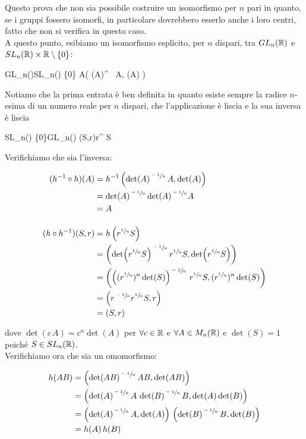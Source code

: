 Questo prova che non sia possibile costruire un isomorfismo per $ n $ pari in quanto, se i gruppi fossero isomorfi, in particolare dovrebbero esserlo anche i loro centri, fatto che non si verifica in questo caso.\\
A questo punto, esibiamo un isomorfismo esplicito, per $ n $ dispari, tra $ GL_{n}(\mathbb{R}) $ e $ SL_{n}(\mathbb{R}) \times \mathbb{R} \setminus \{0\} $:

%
	{GL_{n}(\R)}{SL_{n}(\R) \times \R \setminus \{0\}}%
	{A}{\left( \det(A)^{} \, A, \det(A) \right)}

Notiamo che la prima entrata è ben definita in quanto esiste sempre la radice $ n $-esima di un numero reale per $ n $ dispari, che l'applicazione è liscia e la sua inversa è liscia

%
	{SL_{n}(\R) \times \R \setminus \{0\}}{GL_{n}(\R)}%
	{(S,r)}{r^{} S}
	
Verifichiamo che sia l'inversa:

\begin{align}
	\begin{split}
		(h^{-1} \circ h)(A) &= h^{-1} \left( \det(A)^{\sfrac{-1}{n}} \, A, \det(A) \right)\\
		&= \det(A)^{\sfrac{-1}{n}} \det(A)^{\sfrac{-1}{n}} A\\
		&= A\\\\
		(h \circ h^{-1})(S,r) &= h \left( r^{\sfrac{1}{n}} S \right)\\
		&= \left( \det(r^{\sfrac{1}{n}} S)^{\sfrac{-1}{n}} \, r^{\sfrac{1}{n}} S, \det(r^{\sfrac{1}{n}} S) \right)\\
		&= \left( \left( (r^{\sfrac{1}{n}})^{n} \det(S) \right)^{\sfrac{-1}{n}} \, r^{\sfrac{1}{n}} S, (r^{\sfrac{1}{n}})^{n} \det(S) \right)\\
		&= \left( r^{\sfrac{-1}{n}} r^{\sfrac{1}{n}} S, r \right)\\
		&= (S,r)
	\end{split}
\end{align}

dove $ \det(c \, A) = c^{n} \det(A) $ per $ \forall c \in \mathbb{R} $ e $ \forall A \in M_{n}(\mathbb{R}) $ e $ \det(S) = 1 $ poiché $ S \in SL_{n} (\mathbb{R}) $.\\
Verifichiamo ora che sia un omomorfismo:

\begin{align}
	\begin{split}
		h(A B) &= \left( \det(A B)^{\sfrac{-1}{n}} \, A B, \det(A B) \right)\\
		&= \left( \det(A)^{\sfrac{-1}{n}} \, A \, \det(B)^{\sfrac{-1}{n}} \, B, \det(A) \det(B) \right)\\
		&= \left( \det(A)^{\sfrac{-1}{n}} \, A, \det(A) \right) \, \left( \det(B)^{\sfrac{-1}{n}} \, B, \det(B) \right)\\
		&= h(A) \, h(B)
	\end{split}
\end{align}


